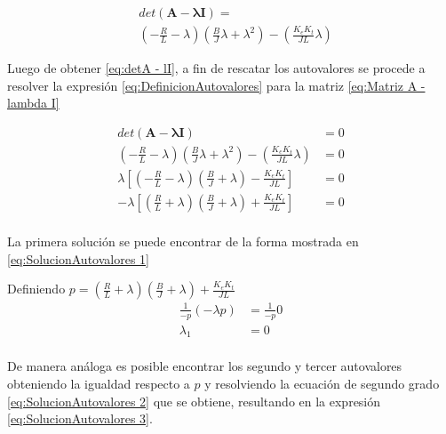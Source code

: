\begin{equation}
  \begin{aligned}
    &det\left(\mathbf{A-\lambda I}\right) = \\
    &\left(-\tfrac{R}{L}-\lambda\right)\left(\tfrac{B}{J}\lambda+\lambda^2\right)
    -\left(\tfrac{K_e K_t}{JL}\lambda\right)
    \label{eq:detA  - lI}
  \end{aligned}
\end{equation}

Luego de obtener \eqref{eq:detA  - lI}, a fin de rescatar los autovalores se procede
a resolver la expresión \eqref{eq:DefinicionAutovalores} para la matriz \eqref{eq:Matriz A - lambda I}

\begin{equation*}
  \begin{aligned}
    det\left(\mathbf{A-\lambda I}\right) &=0  \\
    \left(-\tfrac{R}{L}-\lambda\right)\left(\tfrac{B}{J}\lambda+\lambda^2\right)
    -\left(\tfrac{K_e K_t}{JL}\lambda\right)
                                         &=0  \\
    \lambda\left[
    \left(-\tfrac{R}{L}-\lambda\right)\left(\tfrac{B}{J}+\lambda\right)
    -\tfrac{K_e K_t}{JL}
    \right]
                                         &=0  \\
    -\lambda\left[
    \left(\tfrac{R}{L}+\lambda\right)\left(\tfrac{B}{J}+\lambda\right)
    +\tfrac{K_e K_t}{JL}
    \right]
                                         &=0  \\
  \end{aligned}
\end{equation*}

La primera solución se puede encontrar de la forma mostrada en \eqref{eq:SolucionAutovalores 1}

Definiendo $p= \left(\tfrac{R}{L}+\lambda\right)\left(\tfrac{B}{J}+\lambda\right)
    +\tfrac{K_e K_t}{JL} $
\begin{equation}
  \begin{aligned}
    \frac1{-p}\left(-\lambda p\right)
     &=\frac1{-p}0\\
    \lambda_1 &=0\\
     \label{eq:SolucionAutovalores 1}
  \end{aligned}
\end{equation}

De manera análoga es posible encontrar los segundo y tercer autovalores
obteniendo la igualdad respecto a $p$ y resolviendo la ecuación
de segundo grado \eqref{eq:SolucionAutovalores 2} que se obtiene,
resultando en la expresión \eqref{eq:SolucionAutovalores 3}.

